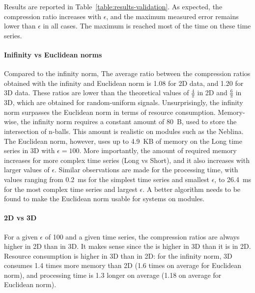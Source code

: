 \documentclass[10pt, conference, compsocconf]{IEEEtran}
\newcommand{\todo}[1]{\marginpar{\parbox{18mm}{\flushleft\tiny\color{red}\textbf{TODO}:
      #1}}}
\begin{document}
Results are reported in Table~\ref{table:results-validation}. 
As expected, the compression ratio increases with $\epsilon$, and the 
maximum measured error remains lower than $\epsilon$ in all cases. The 
maximum is reached most of the time on these time series.

\paragraph{Inifinity vs Euclidean norms}
Compared to the infinity norm, The average ratio between the compression ratios obtained
with the infinity and Euclidean norm is 1.08 for 2D data, and 1.20 
for 3D data. These ratios are lower than the theoretical values of 
$\frac{4}{\pi}$ in 2D and $\frac{6}{\pi}$ in 3D, which are obtained for 
random-uniform signals. Unsurprisingly, the infinity norm surpasses the 
Euclidean norm in terms of resource consumption. Memory-wise, the 
infinity norm requires a constant amount of 80~B, used to store the 
intersection of n-balls. This amount is realistic on modules such as
the Neblina. The Euclidean norm, however, uses up to 4.9~KB of memory 
on the Long time series in 3D with $\epsilon=100$. More importantly, 
the amount of required memory increases for more complex time series 
(Long vs Short), and it also increases with larger 
values of $\epsilon$. Similar observations are made for the processing 
time, with values ranging from 0.2~ms for the simplest time series and 
smallest $\epsilon$, to 26.4~ms for the most complex time series and 
largest $\epsilon$. A better algorithm needs to be found to make the 
Euclidean norm usable for systems on modules.

\paragraph{2D vs 3D}
For a given $\epsilon$ of 100 and a given time series, the compression 
ratios are always higher in 2D than in 3D. It makes sense since the 
\todo{x} is higher in 3D than it is in 2D. Resource consumption is 
higher in 3D than in 2D: for the infinity norm, 3D consumes 1.4 times 
more memory than 2D (1.6 times on average for Euclidean norm), and 
processing time is 1.3 longer on average (1.18 on average for Euclidean 
norm).
\end{document}
